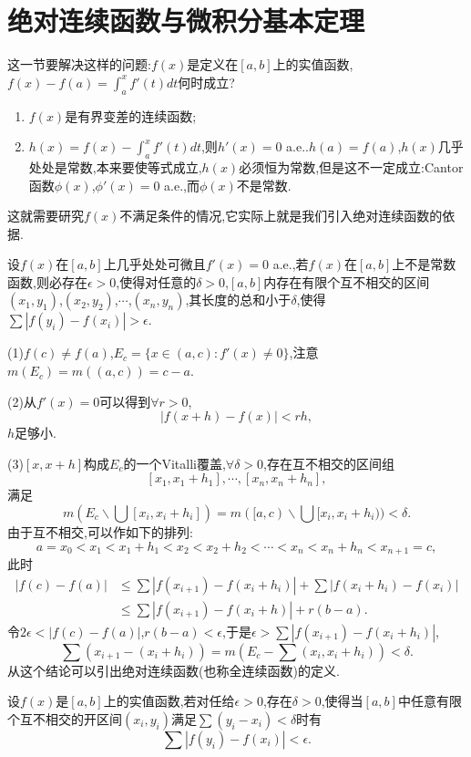 \documentclass[12pt,a4paper,openany]{book}
\begin{document}
\section{绝对连续函数与微积分基本定理}
这一节要解决这样的问题:$f(x)$是定义在$[a,b]$上的实值函数,$f(x)-f(a)=\int_{a}^{x}{f'(t)dt}$何时成立?
\begin{enumerate}
\item $f(x)$是有界变差的连续函数;
\item $h(x)=f(x)-\int_{a}^{x}{f'(t)dt}$,则$h'(x)=0$ a.e..$h(a)=f(a)$,$h(x)$几乎处处是常数,本来要使等式成立,$h(x)$必须恒为常数,但是这不一定成立:Cantor函数$\phi(x)$,$\phi'(x)=0$ a.e.,而$\phi(x)$不是常数.
\end{enumerate}

这就需要研究$f(x)$不满足条件的情况,它实际上就是我们引入绝对连续函数的依据.

设$f(x)$在$[a,b]$上几乎处处可微且$f'(x)=0$ a.e.,若$f(x)$在$[a,b]$上不是常数函数,则必存在$\epsilon>0$,使得对任意的$\delta>0$,$[a,b]$内存在有限个互不相交的区间$(x_1,y_1)$,$(x_2,y_2)$,$\cdots$,$(x_n,y_n)$,其长度的总和小于$\delta$,使得$\sum{|f(y_i)-f(x_i)|}>\epsilon$.

(1)$f(c) \neq f(a)$,$E_c = \{x\in(a,c):f'(x)\neq 0\}$,注意$m(E_c)=m((a,c))=c-a$.

(2)从$f'(x)=0$可以得到$\forall r>0$,
\[
|f(x+h)-f(x)|<rh,
\]
$h$足够小.

(3)$[x,x+h]$构成$E_c$的一个Vitalli覆盖,$\forall \delta>0$,存在互不相交的区间组
\[
[x_1,x_1+h_1],\cdots,[x_n,x_n+h_n],
\]
满足
\[
m(E_c \backslash \bigcup{[x_i,x_i+h_i]}) = m([a,c) \backslash \bigcup{[x_i,x_i+h_i)}) < \delta.
\]
由于互不相交,可以作如下的排列:
\[
a = x_0<x_1<x_1+h_1<x_2<x_2+h_2<\cdots<x_n<x_n+h_n<x_{n+1}=c,
\]
此时
\[
\begin{aligned}
|f(c)-f(a)| &\le \sum{|f(x_{i+1}) - f(x_i+h_i)|} + \sum{|f(x_i+h_i) - f(x_i)|} \\
&\le \sum{|f(x_{i+1}) - f(x_i+h)|} + r(b-a).
\end{aligned}
\]
令$2\epsilon<|f(c)-f(a)|$,$r(b-a)<\epsilon$,于是$\epsilon>\sum{|f(x_{i+1}) - f(x_i+h_i)|}$,
\[
\sum{(x_{i+1} - (x_i+h_i))} = m(E_c - \sum{(x_i,x_i+h_i)}) <\delta.
\]
从这个结论可以引出绝对连续函数(也称全连续函数)的定义.

设$f(x)$是$[a,b]$上的实值函数,若对任给$\epsilon>0$,存在$\delta>0$,使得当$[a,b]$中任意有限个互不相交的开区间$(x_i,y_i)$满足$\sum(y_i-x_i)<\delta$时有
\[
\sum|f(y_i)-f(x_i)|<\epsilon.
\]
\end{document}
